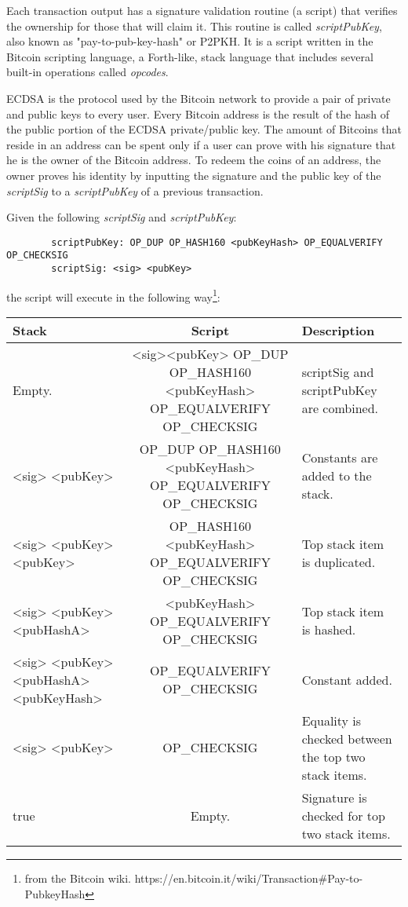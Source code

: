 		Each transaction output has a signature validation routine (a script) that verifies the ownership for those that will claim it. This routine is called \textit{scriptPubKey}, also known as "pay-to-pub-key-hash" or P2PKH. It is a script written in the Bitcoin scripting language, a Forth-like, stack language that includes several built-in operations called \textit{opcodes}. 
		
		ECDSA is the protocol used by the Bitcoin network to provide a pair of private and public keys to every user. Every Bitcoin address is the result of the hash of the public portion of the ECDSA private/public key. The amount of Bitcoins that reside in an address can be spent only if a user can prove with his signature that he is the owner of the Bitcoin address. To redeem the coins of an address, the owner proves his identity by inputting the signature and the public key of the \textit{scriptSig} to a \textit{scriptPubKey} of a previous transaction.
		
		Given the following \textit{scriptSig} and \textit{scriptPubKey}:
		
		\begin{verbatim}
		scriptPubKey: OP_DUP OP_HASH160 <pubKeyHash> OP_EQUALVERIFY OP_CHECKSIG
		scriptSig: <sig> <pubKey>
		\end{verbatim}
		
		the script will execute in the following way\footnote{from the Bitcoin wiki. https://en.bitcoin.it/wiki/Transaction\#Pay-to-PubkeyHash}:
		\begin{center}
			\begin{tabulary}{\textwidth}{|L|C|L|}
			\hline
			\textbf{Stack} & \textbf{Script} & \textbf{Description} \\ \hline
			Empty. & <sig><pubKey> OP\_DUP OP\_HASH160 <pubKeyHash> OP\_EQUALVERIFY OP\_CHECKSIG & scriptSig and scriptPubKey are combined. \\ \hline
			<sig> <pubKey> & OP\_DUP OP\_HASH160 <pubKeyHash> OP\_EQUALVERIFY OP\_CHECKSIG & Constants are added to the stack. \\ \hline
			<sig> <pubKey> <pubKey> & OP\_HASH160 <pubKeyHash> OP\_EQUALVERIFY OP\_CHECKSIG & Top stack item is duplicated. \\ \hline
			<sig> <pubKey> <pubHashA> & <pubKeyHash> OP\_EQUALVERIFY OP\_CHECKSIG & Top stack item is hashed. \\ \hline
			<sig> <pubKey> <pubHashA> <pubKeyHash> & OP\_EQUALVERIFY OP\_CHECKSIG & Constant added. \\ \hline
			<sig> <pubKey> & OP\_CHECKSIG & Equality is checked between the top two stack items. \\ \hline
			true & Empty. & Signature is checked for top two stack items. \\
			\hline
			\end{tabulary}
		\end{center}
		
